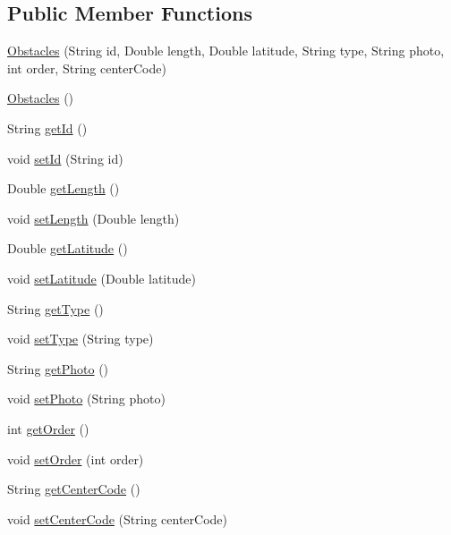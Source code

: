 \subsection*{Public Member Functions}
\begin{DoxyCompactItemize}
\item 
\mbox{\hyperlink{classcom_1_1osoc_1_1oncera_1_1javabean_1_1_obstacles_a2b39eeb42ece44d311adc88b285b23b0}{Obstacles}} (String id, Double length, Double latitude, String type, String photo, int order, String center\+Code)
\item 
\mbox{\hyperlink{classcom_1_1osoc_1_1oncera_1_1javabean_1_1_obstacles_ac66f725ee11c0c6b2b301210586388a0}{Obstacles}} ()
\item 
String \mbox{\hyperlink{classcom_1_1osoc_1_1oncera_1_1javabean_1_1_obstacles_ab231d92d1383e906270efb5aebb3057b}{get\+Id}} ()
\item 
void \mbox{\hyperlink{classcom_1_1osoc_1_1oncera_1_1javabean_1_1_obstacles_a437961ce0c383747b78c5769bdc11145}{set\+Id}} (String id)
\item 
Double \mbox{\hyperlink{classcom_1_1osoc_1_1oncera_1_1javabean_1_1_obstacles_af983f8cd499c75fac7fca7f14858e748}{get\+Length}} ()
\item 
void \mbox{\hyperlink{classcom_1_1osoc_1_1oncera_1_1javabean_1_1_obstacles_aac2fa765311ecbfdf654fe85237902fc}{set\+Length}} (Double length)
\item 
Double \mbox{\hyperlink{classcom_1_1osoc_1_1oncera_1_1javabean_1_1_obstacles_a482ac10d60552869214619e6698bbd59}{get\+Latitude}} ()
\item 
void \mbox{\hyperlink{classcom_1_1osoc_1_1oncera_1_1javabean_1_1_obstacles_aa77d26fe97117a28cce7bef327090559}{set\+Latitude}} (Double latitude)
\item 
String \mbox{\hyperlink{classcom_1_1osoc_1_1oncera_1_1javabean_1_1_obstacles_a934da84ea4046d96ff7ce09e042d30db}{get\+Type}} ()
\item 
void \mbox{\hyperlink{classcom_1_1osoc_1_1oncera_1_1javabean_1_1_obstacles_a4d3765d93fb192bdc1ed6e3403f8d189}{set\+Type}} (String type)
\item 
String \mbox{\hyperlink{classcom_1_1osoc_1_1oncera_1_1javabean_1_1_obstacles_a46806579f255294b0552a2e432e40b8a}{get\+Photo}} ()
\item 
void \mbox{\hyperlink{classcom_1_1osoc_1_1oncera_1_1javabean_1_1_obstacles_a57e6588eba62f178e4b0dbf15ec8ae2e}{set\+Photo}} (String photo)
\item 
int \mbox{\hyperlink{classcom_1_1osoc_1_1oncera_1_1javabean_1_1_obstacles_ac28419107c04b29e6720ad8fb36b265e}{get\+Order}} ()
\item 
void \mbox{\hyperlink{classcom_1_1osoc_1_1oncera_1_1javabean_1_1_obstacles_aa761e78ce83f0e297dc72164497b9275}{set\+Order}} (int order)
\item 
String \mbox{\hyperlink{classcom_1_1osoc_1_1oncera_1_1javabean_1_1_obstacles_ac32eae94eeb9c0ad7c41c9708cf3e230}{get\+Center\+Code}} ()
\item 
void \mbox{\hyperlink{classcom_1_1osoc_1_1oncera_1_1javabean_1_1_obstacles_a763ec4ffbd2410b567d4a5e1798322b2}{set\+Center\+Code}} (String center\+Code)
\end{DoxyCompactItemize}


